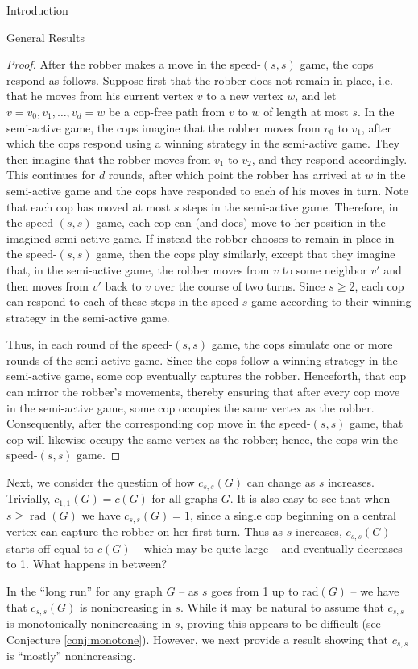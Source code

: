 \documentclass[12pt]{amsart}
\theoremstyle{definition}
\DeclareMathOperator{\rad}{rad}
\newcommand{\speeds}{c_{s,s}}
\newcommand{\speed}[1]{c_{#1,#1}}
\begin{document}
\begin{section}{Introduction}
\begin{section}{General Results}
\begin{proof}
After the robber makes a move in the speed-$(s,s)$ game, the cops respond as follows.  Suppose first that the robber does not remain in place, i.e. that he moves from his current vertex $v$ to a new vertex $w$, and let $v=v_0, v_1, \dots, v_d = w$ be a cop-free path from $v$ to $w$ of length at most $s$.  In the semi-active game, the cops imagine that the robber moves from $v_0$ to $v_1$, after which the cops respond using a winning strategy in the semi-active game.  They then imagine that the robber moves from $v_1$ to $v_2$, and they respond accordingly.  This continues for $d$ rounds, after which point the robber has arrived at $w$ in the semi-active game and the cops have responded to each of his moves in turn.  Note that each cop has moved at most $s$ steps in the semi-active game.  Therefore, in the speed-$(s,s)$ game, each cop can (and does) move to her position in the imagined semi-active game.  If instead the robber chooses to remain in place in the speed-$(s,s)$ game, then the cops play similarly, except that they imagine that, in the semi-active game, the robber moves from $v$ to some neighbor $v'$ and then moves from $v'$ back to $v$ over the course of two turns.  Since $s\ge 2$, each cop can respond to each of these steps in the speed-$s$ game according to their winning strategy in the semi-active game.

Thus, in each round of the speed-$(s,s)$ game, the cops simulate one or more rounds of the semi-active game.  Since the cops follow a winning strategy in the semi-active game, some cop eventually captures the robber.  Henceforth, that cop can mirror the robber's movements, thereby ensuring that after every cop move in the semi-active game, some cop occupies the same vertex as the robber.  Consequently, after the corresponding cop move in the speed-$(s,s)$ game, that cop will likewise occupy the same vertex as the robber; hence, the cops win the speed-$(s,s)$ game. 
\end{proof}

Next, we consider the question of how $\speeds(G)$ can change as $s$ increases.  Trivially, $\speed{1}(G) = c(G)$ for all graphs $G$.  It is also easy to see that when $s \ge \rad(G)$ we have $\speeds(G) = 1$, since a single cop beginning on a central vertex can capture the robber on her first turn.  Thus as $s$ increases, $\speeds(G)$ starts off equal to $c(G)$ -- which may be quite large -- and eventually decreases to 1.  What happens in between?

In the ``long run'' for any graph $G$ -- as $s$ goes from 1 up to $\textrm{rad}(G)$ -- we have that $\speeds(G)$ is nonincreasing in $s$.  While it may be natural to assume that $\speeds$ is monotonically nonincreasing in $s$, proving this appears to be difficult (see Conjecture \ref{conj:monotone}).  However, we next provide a result showing that $\speeds$ is ``mostly'' nonincreasing.


\end{section}
\end{section}
\end{document}
